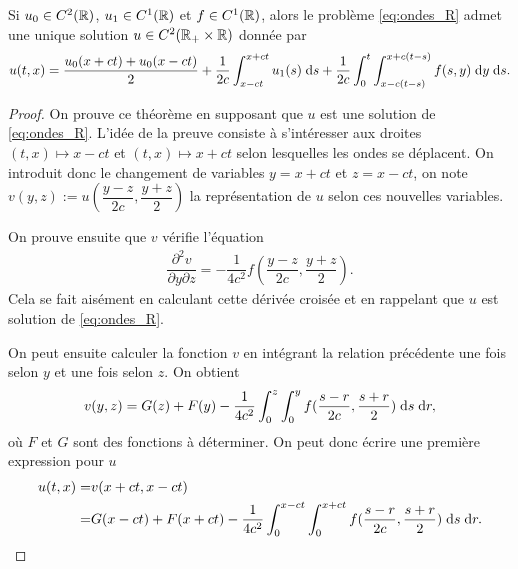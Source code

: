 \documentclass[12pt,a4paper,twoside]{article}
\begin{document}
\begin{theorem}
  \label{thm:d_Alembert}
  Si $u_0 \in C^2(\mathbb{R})$, $u_1 \in C^1(\mathbb{R})$ et $f \in C^1(\mathbb{R})$,
  alors le probl\`eme \eqref{eq:ondes_R} admet une unique solution 
  $u \in C^2(\mathbb{R}_+ \times \mathbb{R})$ donn\'ee par 
  \begin{align*}
    u(t,x) = \dfrac{u_0(x+ct) + u_0(x-ct)}{2} 
    + \dfrac{1}{2c} \int_{x-ct}^{x+ct} u_1(s) \;\mathrm{d} s
    + \dfrac{1}{2c} \int_0^t \int_{x - c(t-s)}^{x+c(t-s)} f(s,y) \;\mathrm{d} y \;\mathrm{d} s .
  \end{align*}
\end{theorem}



\begin{proof}
  On prouve ce th\'eor\`eme en supposant que $u$ est une solution de \eqref{eq:ondes_R}.
  L'id\'ee de la preuve consiste \`a s'int\'eresser aux droites $(t,x) \mapsto x-ct$
  et $(t,x) \mapsto x+ct$ selon lesquelles les ondes se d\'eplacent.
  On introduit donc le changement de variables $y = x+ct$ et $z = x-ct$,
  on note $v(y,z) := u(\dfrac{y-z}{2c} , \dfrac{y+z}{2})$ la repr\'esentation
  de $u$ selon ces nouvelles variables.

  On prouve ensuite que $v$ v\'erifie l'\'equation
  \begin{align*}
    \dfrac{\partial^2 v}{\partial y \partial z} = - \dfrac{1}{4 c^2} f (\dfrac{y-z}{2c} , \dfrac{y+z}{2}) .
  \end{align*}
  Cela se fait ais\'ement en calculant cette d\'eriv\'ee crois\'ee et en rappelant que $u$ 
  est solution de \eqref{eq:ondes_R}.

  On peut ensuite calculer la fonction $v$ en int\'egrant la relation pr\'ec\'edente
  une fois selon $y$ et une fois selon $z$.
  On obtient
  \begin{align*}
    v(y,z) = G(z) + F(y) - \dfrac{1}{4c^2} \int_0^z \int_0^y f(\dfrac{s-r}{2c} , \dfrac{s+r}{2})
    \;\mathrm{d} s \;\mathrm{d} r ,
  \end{align*}
  o\`u $F$ et $G$ sont des fonctions \`a d\'eterminer.
  On peut donc \'ecrire une premi\`ere expression pour $u$
  \begin{align*}
    u(t,x) 
    =& v(x+ct,x-ct)
    \\
    =& G(x-ct) + F(x+ct) - \dfrac{1}{4c^2} \int_{0}^{x-ct} \int_0^{x+ct} f(\dfrac{s-r}{2c} , \dfrac{s+r}{2}) 
       \;\mathrm{d} s \;\mathrm{d} r .
  \end{align*}


\end{proof}
\end{document}
